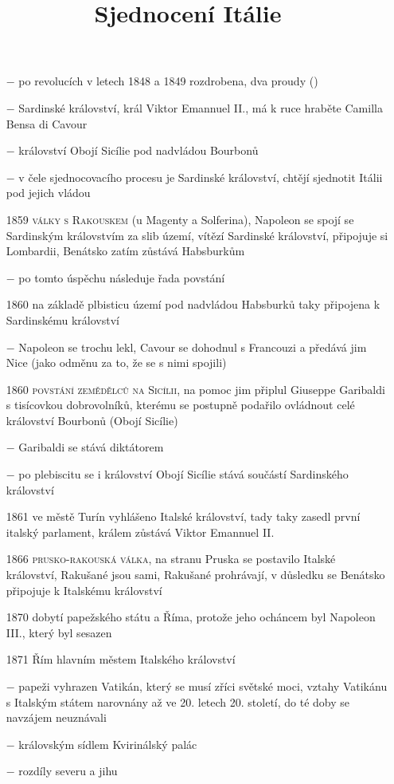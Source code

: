 \documentclass{article}
\title{\vspace{-2cm}Sjednocení Itálie\vspace{-1.7cm}}
\date{}
\author{}
\begin{document}
\maketitle

\begin{itemize}
    \vspace{-0.5em}
    \setlength\itemsep{0.15em}
    \item[$-$] po revolucích v letech 1848 a 1849 rozdrobena, dva proudy ()
    \item[$-$] Sardinské království, král Viktor Emannuel II., má k ruce hraběte Camilla Bensa di Cavour
    \item[$-$] království Obojí Sicílie pod nadvládou Bourbonů
    \item[$-$]  v čele sjednocovacího procesu je Sardinské království, chtějí sjednotit Itálii pod jejich vládou
    \item[1859] \textsc{války s Rakouskem} (u Magenty a Solferina), Napoleon se spojí se Sardinským královstvím za slib území, vítězí Sardinské království, připojuje si Lombardii, Benátsko zatím zůstává Habsburkům
    \item[$-$] po tomto úspěchu následuje řada povstání
    \item[1860] na základě plbisticu území pod nadvládou Habsburků taky připojena k Sardinskému království
    \item[$-$] Napoleon se trochu lekl, Cavour se dohodnul s Francouzi a předává jim Nice (jako odměnu za to, že se s nimi spojili)
    \item[1860] \textsc{povstání zemědělců na Sicílii}, na pomoc jim připlul Giuseppe Garibaldi s tisícovkou dobrovolníků, kterému se postupně podařilo ovládnout celé království Bourbonů (Obojí Sicílie)
    \item[$-$] Garibaldi se stává diktátorem
    \item[$-$] po plebiscitu se i království Obojí Sicílie stává součástí Sardinského království
    \item[1861] ve městě Turín vyhlášeno Italské království, tady taky zasedl první italský parlament, králem zůstává Viktor Emannuel II.
    \item[1866] \textsc{prusko-rakouská válka}, na stranu Pruska se postavilo Italské království, Rakušané jsou sami, Rakušané prohrávají, v důsledku se Benátsko připojuje k Italskému království
    \item[1870] dobytí papežského státu a Říma, protože jeho ocháncem byl Napoleon III., který byl sesazen
    \item[1871] Řím hlavním městem Italského království
    \item[$-$] papeži vyhrazen Vatikán, který se musí zříci světské moci, vztahy Vatikánu  s Italským státem narovnány až ve 20. letech 20. století, do té doby se navzájem neuznávali
    \item[$-$] královským sídlem Kvirinálský palác
    \item[$-$] rozdíly severu a jihu
\end{itemize}
\end{document}
